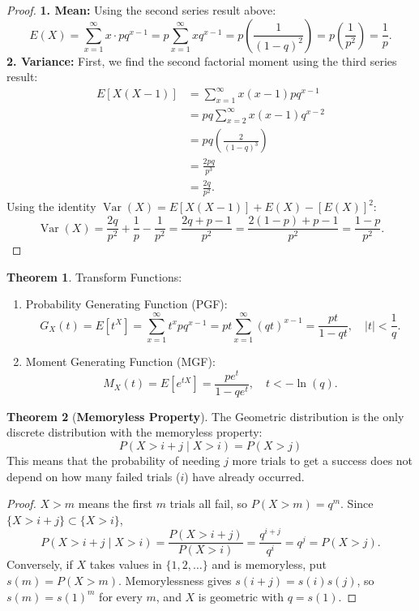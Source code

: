 \documentclass[12pt,a4paper]{report}
\theoremstyle{definition}
\newtheorem{thm}{Theorem}[section]
\theoremstyle{plain}
\theoremstyle{definition}
\begin{document}
\begin{proof}
\textbf{1. Mean:} Using the second series result above:\[ E(X) = \sum_{x=1}^{\infty} x \cdot p q^{x-1} = p \sum_{x=1}^{\infty} x q^{x-1} = p \left( \frac{1}{(1-q)^2} \right) = p \left( \frac{1}{p^2} \right) = \frac{1}{p}. \]
\textbf{2. Variance:} First, we find the second factorial moment using the third series result:
\begin{align*}
E[X(X-1)] & = \sum_{x=1}^{\infty} x(x-1) p q^{x-1}\\
&  = pq \sum_{x=2}^{\infty} x(x-1) q^{x-2}\\
& = pq \left( \frac{2}{(1-q)^3} \right)\\
& = \frac{2pq}{p^3}\\
& = \frac{2q}{p^2}.
\end{align*} Using the identity $\operatorname{Var}(X) = E[X(X-1)] + E(X) - [E(X)]^2$:\[ \operatorname{Var}(X) = \frac{2q}{p^2} + \frac{1}{p} - \frac{1}{p^2} = \frac{2q + p - 1}{p^2} = \frac{2(1-p) + p - 1}{p^2} = \frac{1-p}{p^2}. \]
\end{proof}




\begin{thm} Transform Functions:
\begin{enumerate}
\item Probability Generating Function (PGF): \[ G_X(t) = E[t^X] = \sum_{x=1}^{\infty} t^x p q^{x-1} = pt \sum_{x=1}^{\infty} (qt)^{x-1} = \frac{pt}{1-qt}, \quad |t| < \frac{1}{q}. \]
\item Moment Generating Function (MGF):\[ M_X(t) = E[e^{tX}] = \frac{pe^t}{1-qe^t}, \quad t < -\ln(q). \]
\end{enumerate}
\end{thm}



\begin{thm}[\textbf{Memoryless Property}]
The Geometric distribution is the only discrete distribution with the memoryless property:\[ P(X > i+j \mid X > i) = P(X > j) \]This means that the probability of needing $j$ more trials to get a success does not depend on how many failed trials ($i$) have already occurred.
\end{thm}

\begin{proof}
$X>m$ means the first $m$ trials all fail, so $P(X>m) = q^m$. Since $\{X>i + j\}\subset\{X>i\}$,
\[P(X>i + j\mid X>i) = \frac{P(X>i + j)}{P(X>i)} = \frac{q^{i + j}}{q^i} = q^j = P(X>j) .\]
Conversely, if $X$ takes values in $\{1, 2, \dots\}$ and is memoryless, put $s(m) = P(X>m)$.
Memorylessness gives $s(i + j) = s(i)s(j)$, so $s(m) = s(1)^m$ for every $m$, and $X$ is
geometric with $q = s(1)$.
\end{proof}
\end{document}
